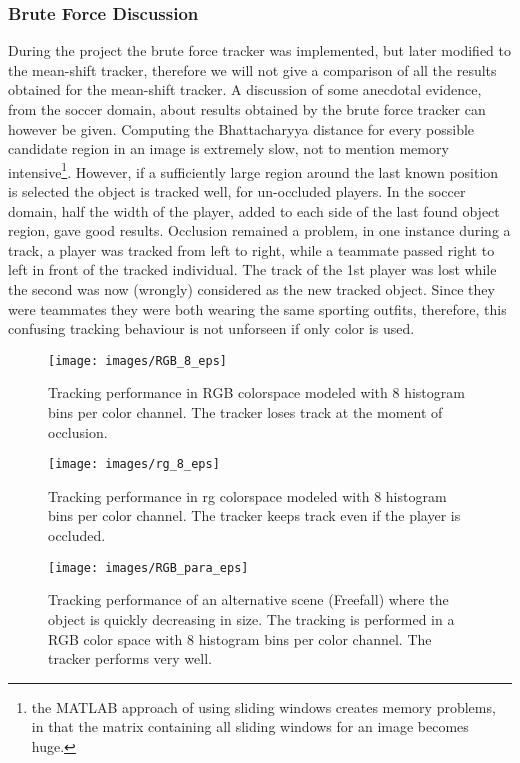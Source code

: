 \documentclass[a4paper,11pt]{article}
\begin{document}
 

\subsubsection{Brute Force Discussion} 
During the project the brute force tracker was implemented, but later modified to the mean-shift tracker, therefore we will not give a comparison of all the results obtained for the mean-shift tracker. A discussion of some anecdotal evidence, from the soccer domain, about results obtained by the brute force tracker can however be given. Computing the Bhattacharyya distance for every possible candidate region in an image is extremely slow, not to mention memory intensive\footnote{the MATLAB approach of using sliding windows creates memory problems, in that the matrix containing all sliding windows for an image becomes huge.}. However, if a sufficiently large region around the last known position is selected the object is tracked well, for un-occluded players. In the soccer domain, half the width of the player, added to each side of the last found object region, gave good results. Occlusion remained a problem, in one instance during a track, a player was tracked from left to right, while a teammate passed right to left in front of the tracked individual. The track of the 1st player was lost while the second was now (wrongly) considered as the new tracked object. Since they were teammates they were both wearing the same sporting outfits, therefore, this confusing tracking behaviour is not unforseen if only color is used.

\begin{figure}[!ht]
\label{fig:RGB_8}
\centering
\texttt{[image: images/RGB\_8\_eps]}
\caption{Tracking performance in RGB colorspace modeled with 8 histogram bins per color channel.
The tracker loses track at the moment of occlusion.}
\label{fig:rg}
\end{figure}

\begin{figure}[!ht]
\label{fig:rg_8}
\centering
\texttt{[image: images/rg\_8\_eps]}
\caption{Tracking performance in rg colorspace modeled with 8 histogram bins per color channel.
The tracker keeps track even if the player is occluded.}
\end{figure}

\begin{figure}[!ht]
\label{fig:para}
\centering
\texttt{[image: images/RGB\_para\_eps]}
\caption{Tracking performance of an alternative scene (Freefall)
where the object is quickly decreasing in size. The tracking is performed in a
RGB color space with 8 histogram bins per color channel. The tracker performs very well.}
\end{figure}
\end{document}
